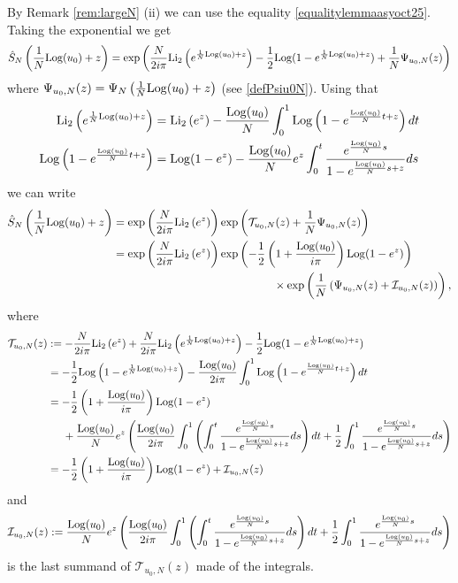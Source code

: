 \documentclass[11pt]{amsart}
\newcommand{\Log}{{\rm Log}}
\begin{document}
{By Remark \ref{rem:largeN} (ii) we can use  the equality \eqref{equalitylemmaasyoct25}. Taking the exponential we get 
$$\hat S_N\left(\frac{1}{N}\Log(u_{0}) +z\right)  = \exp\left(\frac{N}{2i\pi}{\rm Li}_2\left(e^{\frac{1}{N}\Log(u_{0}) + z}\right)-\frac{1}{2}\Log(1-e^{\frac{1}{N}\Log(u_{0}) + z})+\frac{1}{N}{\Psi_{u_0,N}(z)}\right)$$
where $\textstyle {\Psi_{u_0,N}(z)} = \Psi_N\left(\frac{1}{N}\Log(u_{0}) +z\right)$ (see \eqref{defPsiu0N}). Using that
\begin{align}
{\rm Li}_2\left(e^{\frac{1}{N}\Log(u_{0}) + z}\right)  & = {\rm Li}_2\left(e^z\right) -\frac{\Log(u_{0})}{N}\int_0^1 \Log\left(1-e^{\frac{\Log(u_{0})}{N}t + z}\right)dt\label{approx1dec25}\\
\Log\left(1-e^{\frac{\Log(u_{0})}{N}t + z}\right) & = \Log(1-e^z)- \frac{\Log(u_{0})}{N}e^{z}\int_0^t \frac{e^{\frac{\Log(u_{0})}{N}s}}{1-e^{\frac{\Log(u_{0})}{N}s + z}}ds \notag
\end{align}
we can write
\begin{align*} \hat S_N\left( \frac{1}{N}\Log(u_{0}) +z\right)   & =  \exp\left(\frac{N}{2i\pi}{\rm Li}_2\left(e^{z}\right)\right) \exp\left({\mathcal{T}_{u_0,N}(z)}+\frac{1}{N}{\Psi_{u_0,N}(z)}\right)\\ & = \exp\left(\frac{N}{2i\pi}{\rm Li}_2\left(e^{z}\right)\right) \exp\left(-\frac{1}{2}\left(1+\frac{\Log(u_0)}{i\pi}\right)\Log(1-e^{z})\right)\\ &  \hspace*{5cm} \times \exp\left(\frac{1}{N}\left({\Psi_{u_0,N}(z)}+
	{\mathcal{I}_{u_0,N}(z)}\right)\right),
\end{align*}
where 
\begin{align*} 
{\mathcal{T}_{u_0,N}(z)}
&:=  - \frac{N}{2i\pi}{\rm Li}_2\left(e^{z}\right)
+\frac{N}{2i\pi}{\rm Li}_2\left(e^{\frac{1}{N}\Log(u_{0}) + z}\right)-\frac{1}{2}\Log(1-e^{\frac{1}{N}\Log(u_{0}) + z})
\\
	&= -\frac{1}{2}\Log\left(1-e^{\frac{1}{N}\Log(u_{0}) + z}\right) -\frac{\Log(u_{0})}{2i\pi}\int_0^1 \Log\left(1-e^{\frac{\Log(u_{0})}{N}t + z}\right)dt \\  
	&  =
-\frac{1}{2}\left(1+\frac{\Log(u_0)}{i\pi}\right)\Log(1-e^{z})\\ & \hspace*{0.5cm}+\frac{\Log(u_0)}{N}e^z\left(\frac{\Log(u_0)}{2i\pi}\int_0^1\left(\int_0^t \frac{e^{\frac{\Log(u_{0})}{N}s}}{1-e^{\frac{\Log(u_{0})}{N}s + z}}ds\right)dt + \frac{1}{2}  \int_0^1 \frac{e^{\frac{\Log(u_{0})}{N}s}}{1-e^{\frac{\Log(u_{0})}{N}s + z}}ds\right)\\  
&= -\frac{1}{2}\left(1+\frac{\Log(u_0)}{i\pi}\right)\Log(1-e^{z}) + \mathcal{I}_{u_0,N}(z)
\end{align*}
and
$$\mathcal{I}_{u_0,N}(z):=\frac{\Log(u_0)}{N}e^z\left(\frac{\Log(u_0)}{2i\pi}\int_0^1\left(\int_0^t \frac{e^{\frac{\Log(u_{0})}{N}s}}{1-e^{\frac{\Log(u_{0})}{N}s + z}}ds\right)dt + \frac{1}{2}  \int_0^1 \frac{e^{\frac{\Log(u_{0})}{N}s}}{1-e^{\frac{\Log(u_{0})}{N}s + z}}ds\right)$$
is the last summand of $\mathcal{T}_{u_0,N}(z)$ made of the integrals.

}
\end{document}
